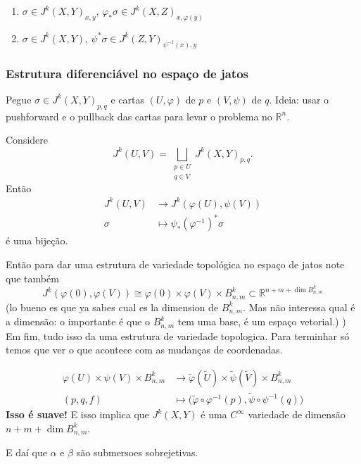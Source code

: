 \begin{remark}\leavevmode
\begin{enumerate}
\item \(\sigma \in J^k(X,Y)_{x,y}\), \(\varphi_* \sigma \in J^k(X,Z)_{x,\varphi(y)}\)
\item \(\sigma \in J^k(X,Y)\), \(\psi ^*\sigma \in J^k(Z,Y)_{\psi^{-1}(x),y}\)
\end{enumerate}
\end{remark}

\subsubsection{Estrutura diferenciável no espaço de jatos}

Pegue \(\sigma \in J^k(X,Y)_{p,q}\) e cartas \((U,\varphi)\) de \(p\) e \((V,\psi)\) de $q$. {\color{4}Ideia:} usar o pushforward e o pullback das cartas para levar o problema no \(\mathbb{R}^n\).

\begin{exercise}\leavevmode
Considere
\[J^k(U,V)= \bigsqcup_{\substack{p \in U \\ q \in V}}J^k(X,Y)_{p,q}.\]
Então
\begin{align*}
	J^k(U,V) &\longrightarrow J^k(\varphi(U),\psi(V)) \\
	\sigma &\longmapsto \psi_*(\varphi^{-1})^*\sigma
\end{align*}
é uma bijeção.
\end{exercise}
Então para dar uma estrutura de variedade topológica no espaço de jatos note que também
\[J^k(\varphi(0),\varphi(V))\cong \varphi(0) \times \varphi(V) \times B^k_{n,m}\subset \mathbb{R}^{n+m+ \dim B^k_{n,m}}\]
(lo bueno es que ya sabes cual es la dimension de \(B^k_{n,m}\). Mas não interessa qual é a dimensão: o importante é que o \(B^k_{n,m}\) tem uma base, é um espaço vetorial.)
)
Em fim, tudo isso da uma estrutura de variedade topologica. Para terminhar só temos que ver o que acontece com as mudanças de coordenadas.

\begin{align*}
	\varphi(U) \times \psi(V) \times B^k_{n,m}  &\longrightarrow \tilde{\varphi}(\tilde{U})\times \tilde{\psi}(\tilde{V}) \times B^k_{n,m} \\
	(p,q,f) &\longmapsto \Big(\tilde{\varphi} \circ \varphi^{-1}(p),\tilde{\psi} \circ \psi^{-1}(q) \Big)
\end{align*}
\textbf{Isso é suave!} E isso implica que \(J^k(X,Y)\) é uma \(C^\infty\) variedade de dimensão \(n+m+ \dim B^k_{n,m}\). 

E daí que \(\alpha\) e \(\beta\) são submersoes sobrejetivas.



